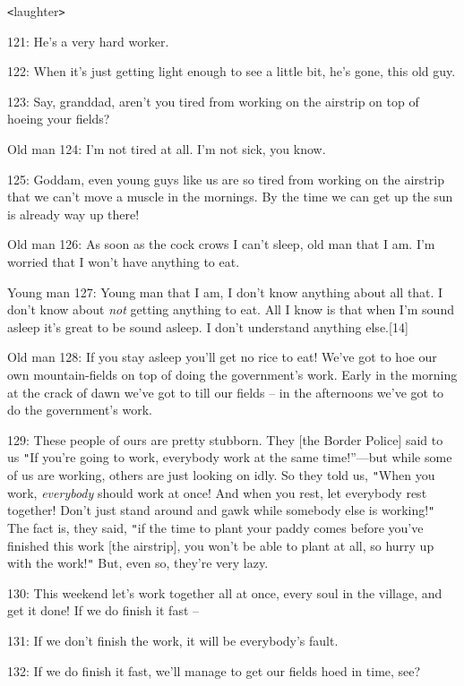 {\texttt{<}laughter\texttt{>}}

{121: He's a very hard worker.}

{122: When it's just getting light enough to see a little bit, he's gone,
this old guy.}

{123: Say, granddad, aren't you tired from working on the airstrip on top
of hoeing your fields?}

{Old man 124: I'm not tired at all. I'm not sick, you know. }

{125: Goddam, even young guys like us are so tired from working on the airstrip
that we can't move a muscle in the mornings. By the time we can get up the sun
is already way up there! }

{Old man 126: As soon as the cock crows I can't sleep, old man that I am.
I'm worried that I won't have anything to eat. }

{Young man 127: Young man that I am, I don't know anything about all that.
I don't know about }{\textit{not}}{ getting anything to eat. All
I know is that when I'm sound asleep it's great to be sound asleep. I don't understand
anything else.[14]}

{Old man 128: If you stay asleep you'll get no rice to eat! We've got to
hoe our own mountain-fields on top of doing the government's work. Early in the
morning at the crack of dawn we've got to till our fields -- in the afternoons
we've got to do the government's work. }

{129: These people of ours are pretty stubborn. They [the Border Police]
said to us \texttt{"}If you're going to work, everybody work at the same time!''---but
while some of us are working, others are just looking on idly. So they told us,
\texttt{"}When you work, }{\textit{everybody}}{ should work at once!
And when you rest, let everybody rest together! Don't just stand around and gawk
while somebody else is working!\texttt{"} The fact is, they said, \texttt{"}if
the time to plant your paddy comes before you've finished this work [the airstrip],
you won't be able to plant at all, so hurry up with the work!\texttt{"} But, even
so, they're very lazy. }

{130: This weekend let's work together all at once, every soul in the village,
and get it done! If we do finish it fast --}

{131: If we don't finish the work, it will be everybody's fault.}

{132: If we do finish it fast, we'll manage to get our fields hoed in time,
see?}

